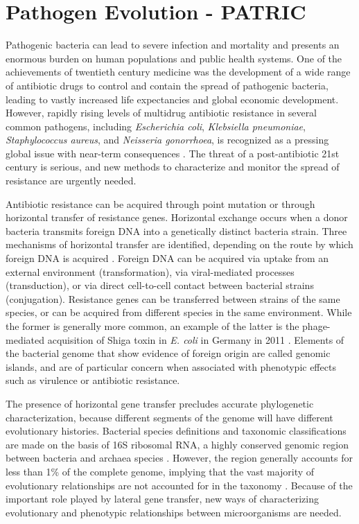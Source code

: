 \chapter{Pathogen Evolution - PATRIC}
\label{ch:pathogens}

Pathogenic bacteria can lead to severe infection and mortality and presents an enormous burden on human populations and public health systems.
One of the achievements of twentieth century medicine was the development of a wide range of antibiotic drugs to control and contain the spread of pathogenic bacteria, leading to vastly increased life expectancies and global economic development.
However, rapidly rising levels of multidrug antibiotic resistance in several common pathogens, including \emph{Escherichia coli}, \emph{Klebsiella pneumoniae}, \emph{Staphylococcus aureus}, and \emph{Neisseria gonorrhoea}, is recognized as a pressing global issue with near-term consequences \cite{Neu:1992,Thomas:2005,WHO:2014}.
The threat of a post-antibiotic 21st century is serious, and new methods to characterize and monitor the spread of resistance are urgently needed.

Antibiotic resistance can be acquired through point mutation or through horizontal transfer of resistance genes.
Horizontal exchange occurs when a donor bacteria transmits foreign DNA into a genetically distinct bacteria strain.
Three mechanisms of horizontal transfer are identified, depending on the route by which foreign DNA is acquired \cite{Ochman:2000}.
Foreign DNA can be acquired via uptake from an external environment (transformation), via viral-mediated processes (transduction), or via direct cell-to-cell contact between bacterial strains (conjugation).
Resistance genes can be transferred between strains of the same species, or can be acquired from different species in the same environment.
While the former is generally more common, an example of the latter is the phage-mediated acquisition of Shiga toxin in \emph{E. coli} in Germany in 2011 \cite{Rohde:2011}.
Elements of the bacterial genome that show evidence of foreign origin are called genomic islands, and are of particular concern when associated with phenotypic effects such as virulence or antibiotic resistance.

The presence of horizontal gene transfer precludes accurate phylogenetic characterization, because different segments of the genome will have different evolutionary histories.
Bacterial species definitions and taxonomic classifications are made on the basis of 16S ribosomal RNA, a highly conserved genomic region between bacteria and archaea species \cite{Woese:1977}.
However, the region generally accounts for less than 1\% of the complete genome, implying that the vast majority of evolutionary relationships are not accounted for in the taxonomy \cite{Dagan:2006}.
Because of the important role played by lateral gene transfer, new ways of characterizing evolutionary and phenotypic relationships between microorganisms are needed.